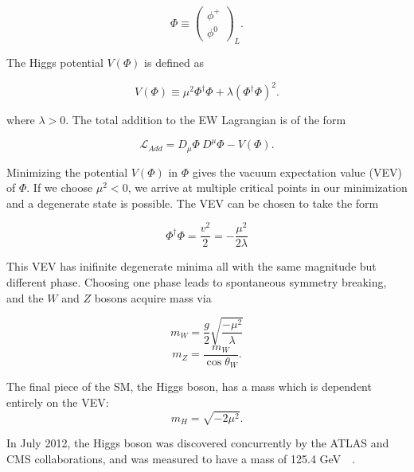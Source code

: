 \begin{equation}
\Phi \equiv \begin{pmatrix}\phi^{+} \\ \phi^{0}\end{pmatrix}_{L}.
\end{equation}

\noindent The Higgs potential $V(\Phi)$ is defined as

\begin{equation}
V(\Phi) \equiv \mu^{2}\Phi^{\dagger}\Phi + \lambda\left(\Phi^{\dagger}\Phi\right)^{2}.
\end{equation}

\noindent where $\lambda > 0$. The total addition to the EW Lagrangian is of the form

\begin{equation}
\mathcal{L}_{Add} = D_{\mu}\Phi\ D^{\mu}\Phi - V(\Phi).
\end{equation}

Minimizing the potential $V(\Phi)$ in $\Phi$ gives the vacuum expectation value (VEV) of $\Phi$. If we choose $\mu^{2} < 0$, we arrive at multiple critical points in our minimization and a degenerate state is possible. The VEV can be chosen to take the form\cite{srednicki}

\begin{equation}
\Phi^\dagger\Phi = \frac{v^2}{2} = -\frac{\mu^2}{2\lambda}
\end{equation}

This VEV has inifinite degenerate minima all with the same magnitude but different phase. Choosing one phase leads to spontaneous symmetry breaking, and the $W$ and $Z$ bosons acquire mass via\cite{halzen}

\begin{equation}
m_{W} = \frac{g}{2}\sqrt{\frac{-\mu^{2}}{\lambda}}
\end{equation}
\begin{equation}
m_{Z} = \frac{m_{W}}{\cos{\theta_W}}.
\end{equation}

The final piece of the SM, the Higgs boson, has a mass which is dependent entirely on the VEV:
\begin{equation}
m_H = \sqrt{-2\mu^2}.
\end{equation}

In July 2012, the Higgs boson was discovered concurrently by the ATLAS and CMS collaborations, and was measured to have a mass of 125.4 GeV~\cite{CMSHiggs}~\cite{ATLASHiggs}.

